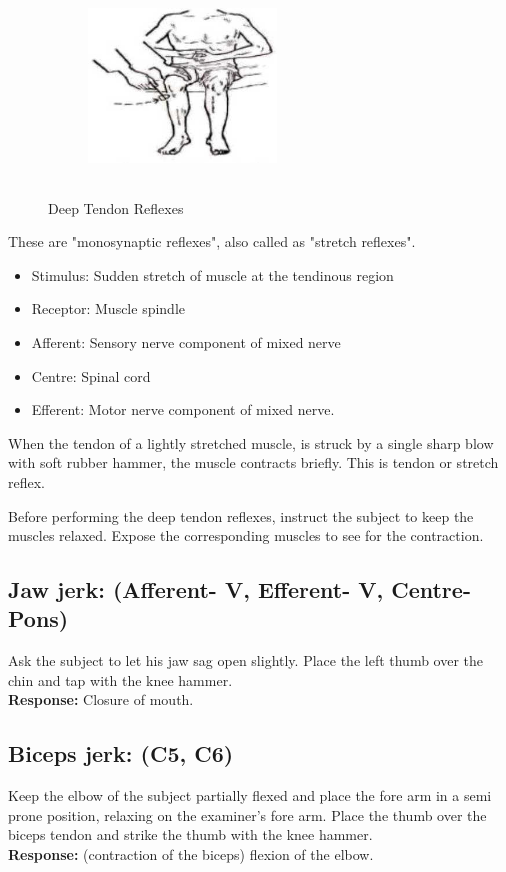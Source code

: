 \documentclass[a4paper,12pt,openany,twoside]{book}
\begin{document}
{\begin{figure}[H]
		\begin{subfigure}[t]{.29\textwidth}
			\centering
			\includegraphics[width=5cm,height=5cm]{./clinicalPhysioPic/reflexes/kneeJerk_2.jpg}
		\end{subfigure}
		\caption*{Deep Tendon Reflexes}
	\end{figure}
}
These are "monosynaptic reflexes", also called as "stretch reflexes".
\begin{itemize}
		\itemsep0em
\item{Stimulus: Sudden stretch of muscle at the tendinous region}
\item{Receptor: Muscle spindle}
\item{Afferent: Sensory nerve component of mixed nerve}
\item{Centre: Spinal cord}
\item{Efferent: Motor nerve component of mixed nerve.}
\end{itemize}
\par
When the tendon of a lightly stretched muscle, is struck by a single sharp blow with soft rubber hammer, the muscle contracts briefly. This is tendon or stretch reflex.
\par
Before performing the deep tendon reflexes, instruct the subject to keep the muscles relaxed. Expose the corresponding muscles to see for the contraction.
\subsection*{Jaw jerk: (Afferent- V, Efferent- V, Centre-Pons)}
	Ask the subject to let his jaw sag open slightly. Place the left thumb over the chin and tap with the knee hammer.\\
\textbf{Response:} Closure of mouth.
\subsection*{Biceps jerk: (C5, C6)}
Keep the elbow of the subject partially flexed and place the fore arm in a semi prone position, relaxing on the examiner's fore arm. Place the thumb over the biceps tendon and strike the thumb with the knee hammer.\\
\textbf{Response:} (contraction of the biceps) flexion of the elbow.
\end{document}
